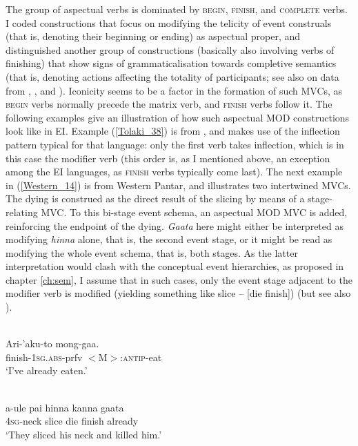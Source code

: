 The group of aspectual verbs is dominated by \textsc{begin}, \textsc{finish}, and \textsc{complete} verbs. I coded constructions that focus on modifying the telicity of event construals (that is, denoting their beginning or ending) as aspectual proper, and distinguished another group of constructions (basically also involving verbs of finishing) that show signs of grammaticalisation towards completive semantics (that is, denoting actions affecting the totality of participants; see also \citealt{huber2014} on data from , , and ). Iconicity seems to be a factor in the formation of such MVCs, as \textsc{begin} verbs normally precede the matrix verb, and \textsc{finish} verbs follow it. The following examples give an illustration of how such aspectual MOD constructions look like in EI. Example (\ref{Tolaki_38}) is from , and makes use of the inflection pattern typical for that language: only the first verb takes inflection, which is in this case the modifier verb (this order is, as I mentioned above, an exception among the EI  languages, as \textsc{finish} verbs typically come last). The next example in (\ref{Western_14}) is from Western Pantar, and illustrates two intertwined MVCs. The dying is construed as the direct result of the slicing by means of a stage-relating MVC. To this bi-stage event schema, an aspectual MOD MVC is added, reinforcing the endpoint of the dying. \textit{Gaata} here might either be interpreted as modifying \textit{hinna} alone, that is, the second event stage, or it might be read as modifying the whole event schema, that is, both stages. As the latter interpretation would clash with the conceptual event hierarchies, as proposed in chapter \ref{ch:sem}, I assume that in such cases, only the event stage adjacent to the modifier verb is modified (yielding something like slice -- [die finish]) (but see also ).

\ea \label{Tolaki_38}
\\
\gll Ari-'aku-to mong-gaa.\\
finish-1\textsc{sg}.\textsc{abs}-prfv $<$M$>$:\textsc{antip}-eat \\
\glft `I've already eaten.'\\ 
\z

\ea \label{Western_14}
\\
\gll a-ule pai hinna kanna gaata \\
4\textsc{sg}-neck slice die finish already \\
\glft `They sliced his neck and killed him.'\\ 
\z

